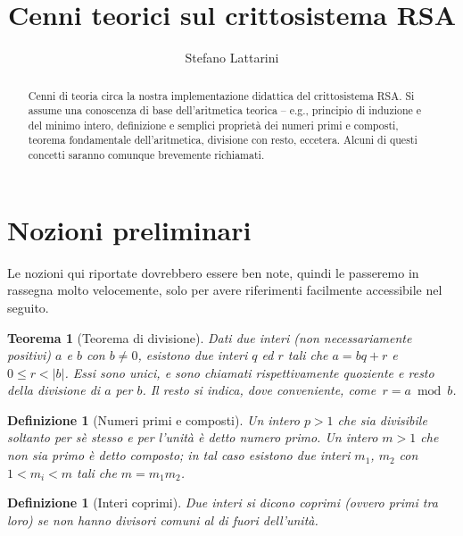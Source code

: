 \documentclass[pdflatex,11pt,a4paper,oneside]{article}
\newcommand{\theauthor}[0]{Stefano Lattarini}
\newcommand{\thetitle}[0]{Cenni teorici sul crittosistema RSA}
\newcommand{\TFA}{teorema fondamentale dell'aritmetica}
\newcommand{\abs}[1]{\left|{#1}\right|}
\newcommand{\mmodop}[0]{\ensuremath{\operatorname{mod}}}
\newcommand{\rem}[2]{\ensuremath{{#1}\:\mmodop\:{#2}}}
\newtheorem{theorem}[TheoremLike]{Teorema}
\newtheorem{definition}[TheoremLike]{Definizione}
\begin{document}
\title{\thetitle}
\author{\theauthor}

\maketitle


\begin{abstract}
  Cenni di teoria circa la nostra implementazione didattica del
  crittosistema RSA.  Si assume una conoscenza di base dell'aritmetica
  teorica -- e.g., principio di induzione e del minimo intero, definizione
  e semplici propriet\`a dei numeri primi e composti, \TFA, divisione con
  resto, eccetera.  Alcuni di questi concetti saranno comunque brevemente
  richiamati.
\end{abstract}


\section{Nozioni preliminari}

Le nozioni qui riportate dovrebbero essere ben note, quindi le
passeremo in rassegna molto velocemente, solo per avere riferimenti
facilmente accessibile nel seguito.

\begin{theorem}[Teorema di divisione]
Dati due interi (non necessariamente positivi) $a$ e $b$ con $b \neq 0$,
esistono due interi $q$ ed $r$ tali che $a = bq + r$ e $0 \leq r
< \abs{b}$. Essi sono unici, e sono chiamati rispettivamente
\emph{quoziente} e \emph{resto} della divisione di $a$ per $b$.
Il resto si indica, dove conveniente, come \,$r = \rem{a}{b}$.
\end{theorem}

\begin{definition}[Numeri primi e composti]
Un intero $p > 1$ che sia divisibile soltanto per s\`e stesso e per
l'unit\`a \`e detto \emph{numero primo}.  Un intero $m > 1$ che non
sia primo \`e detto \emph{composto}; in tal caso esistono due interi
$m_1$, $m_2$ con $1 < m_i < m$ tali che $m = m_1 m_2$.
\end{definition}

\begin{definition}[Interi coprimi]
Due interi si dicono \emph{coprimi} (ovvero \emph{primi tra loro}) se
non hanno divisori comuni al di fuori dell'unit\`a.
\end{definition}
\end{document}
